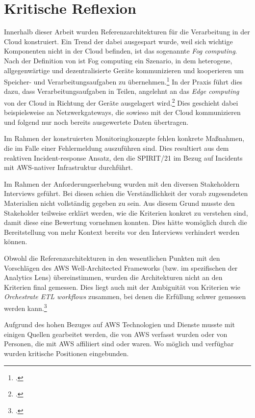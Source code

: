 \section{Kritische Reflexion}\label{section:Kritische-Reflexio}
Innerhalb dieser Arbeit wurden Referenzarchitekturen für die Verarbeitung in der Cloud konstruiert. Ein Trend der dabei ausgespart wurde, weil sich wichtige Komponenten nicht in der Cloud befinden, ist das sogenannte \textit{Fog computing}. Nach der Definition von \citeauthor{Vaquero.2014} ist Fog computing ein Szenario, in dem heterogene, allgegenwärtige und dezentralisierte Geräte kommunizieren und kooperieren um Speicher- und Verarbeitungsaufgaben zu übernehmen.\footcite[Vgl.][30\psq]{Vaquero.2014} In der Praxis führt dies dazu, dass Verarbeitungsaufgaben in Teilen, angelehnt an das \textit{Edge computing} von der Cloud in Richtung der Geräte ausgelagert wird.\footcite[Vgl.][]{Bonomi.2012} Dies geschieht dabei beispielsweise an Netzwerkgateways, die sowieso mit der Cloud kommunizieren und folgend nur noch bereits ausgewertete Daten übertragen. 

Im Rahmen der konstruierten Monitoringkonzepte fehlen konkrete Maßnahmen, die im Falle einer Fehlermeldung auszuführen sind. Dies resultiert aus dem reaktiven Incident-response Ansatz, den die SPIRIT/21 im Bezug auf Incidents mit \ac{AWS}-nativer Infrastruktur durchführt.

Im Rahmen der Anforderungserhebung wurden mit den diversen Stakeholdern Interviews geführt. Bei diesen schien die Verständlichkeit der vorab zugesendeten Materialien nicht vollständig gegeben zu sein. Aus diesem Grund musste den Stakeholder teilweise erklärt werden, wie die Kriterien konkret zu verstehen sind, damit diese eine Bewertung vornehmen konnten. Dies hätte womöglich durch die Bereitstellung von mehr Kontext bereits vor den Interviews verhindert werden können.

Obwohl die Referenzarchitekturen in den wesentlichen Punkten mit den Vorschlägen des \ac{AWS} Well-Architected Frameworks (bzw. im spezifischen der Analytics Lens) übereinstimmen, wurden die Architekturen nicht an den Kriterien final gemessen. Dies liegt auch mit der Ambiguität von Kriterien wie \textit{Orchestrate ETL workflows} zusammen, bei denen die Erfüllung schwer gemessen werden kann.\footcite[Vgl.][6]{Ravirala.2020}

Aufgrund des hohen Bezuges auf \ac{AWS} Technologien und Dienste musste mit einigen Quellen gearbeitet werden, die von \ac{AWS} verfasst wurden oder von Personen, die mit \ac{AWS} affiliiert sind oder waren. Wo möglich und verfügbar wurden kritische Positionen eingebunden.


